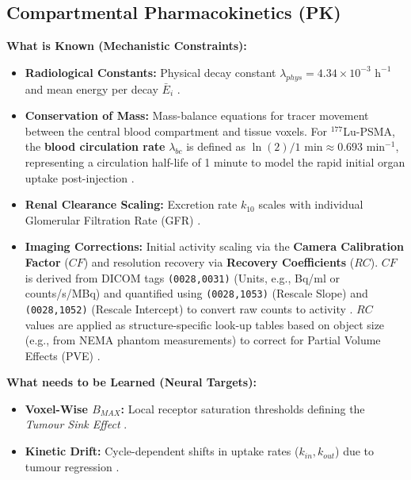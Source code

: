 \documentclass[11pt,a4paper]{article}
\begin{document}
\subsection{Compartmental Pharmacokinetics (PK)}
\textbf{What is Known (Mechanistic Constraints):}
\begin{itemize}
    \item \textbf{Radiological Constants:} Physical decay constant $\lambda_{phys} = 4.34 \times 10^{-3} \text{ h}^{-1}$ and mean energy per decay $\bar{E}_i$ \cite{ReschFouladgar2023, StabinMadsen2019}.
    \item \textbf{Conservation of Mass:} Mass-balance equations for tracer movement between the central blood compartment and tissue voxels. For $^{177}$Lu-PSMA, the \textbf{blood circulation rate} $\lambda_{bc}$ is defined as $\ln(2)/1 \text{ min} \approx 0.693 \text{ min}^{-1}$, representing a circulation half-life of 1 minute to model the rapid initial organ uptake post-injection \cite{HardiansyahYousefzadehNowshahr2024}.
    \item \textbf{Renal Clearance Scaling:} Excretion rate $k_{10}$ scales with individual Glomerular Filtration Rate (GFR) \cite{HardiansyahYousefzadehNowshahr2024}.
    \item \textbf{Imaging Corrections:} Initial activity scaling via the \textbf{Camera Calibration Factor} ($CF$) and resolution recovery via \textbf{Recovery Coefficients} ($RC$). $CF$ is derived from DICOM \cite{BidgoodHorii1992} tags \texttt{(0028,0031)} (Units, e.g., Bq/ml or counts/s/MBq) and quantified using \texttt{(0028,1053)} (Rescale Slope) and \texttt{(0028,1052)} (Rescale Intercept) to convert raw counts to activity \cite{GleisnerChouin2022}. $RC$ values are applied as structure-specific look-up tables based on object size (e.g., from NEMA phantom measurements) to correct for Partial Volume Effects (PVE) \cite{KlettingSchimmel2015}.
\end{itemize}

\textbf{What needs to be Learned (Neural Targets):}
\begin{itemize}
    \item \textbf{Voxel-Wise $B_{MAX}$:} Local receptor saturation thresholds defining the \textit{Tumour Sink Effect} \cite{BegumThieme2018}.
    \item \textbf{Kinetic Drift:} Cycle-dependent shifts in uptake rates ($k_{in}, k_{out}$) due to tumour regression \cite{OkamotoThieme2016, SiebingaVeen2024}.
\end{itemize}
\end{document}
